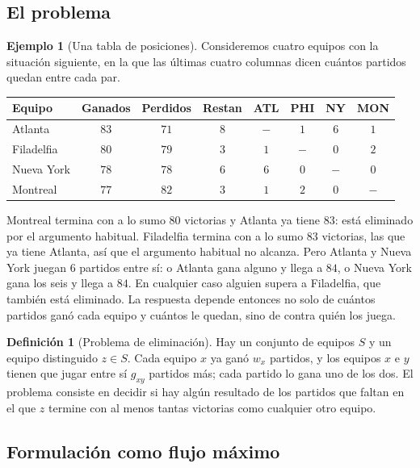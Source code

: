\documentclass[12pt, spanish, oneside, openany]{book}
\theoremstyle{uprightplain}
\theoremstyle{definition}
\newtheorem{definicion}[teorema]{Definición}
\newtheorem{ejemplo}[teorema]{Ejemplo}
\theoremstyle{remark}
\theoremstyle{definition}
\begin{document}
\subsection{El problema}

\begin{ejemplo}[Una tabla de posiciones]
\label{ej:flujo-beisbol}
Consideremos cuatro equipos con la situación siguiente, en la que las últimas cuatro columnas dicen cuántos partidos quedan entre cada par.
\begin{center}
\small
\renewcommand{\arraystretch}{1.15}
\begin{tabular}{@{}lccccccc@{}}
\toprule
\textbf{Equipo} & \textbf{Ganados} & \textbf{Perdidos} & \textbf{Restan} & \textbf{ATL} & \textbf{PHI} & \textbf{NY} & \textbf{MON}\\
\midrule
Atlanta      & $83$ & $71$ & $8$ & $-$ & $1$ & $6$ & $1$\\
Filadelfia   & $80$ & $79$ & $3$ & $1$ & $-$ & $0$ & $2$\\
Nueva York   & $78$ & $78$ & $6$ & $6$ & $0$ & $-$ & $0$\\
Montreal     & $77$ & $82$ & $3$ & $1$ & $2$ & $0$ & $-$\\
\bottomrule
\end{tabular}
\end{center}
Montreal termina con a lo sumo $80$ victorias y Atlanta ya tiene $83$: está eliminado por el argumento habitual. Filadelfia termina con a lo sumo $83$ victorias, las que ya tiene Atlanta, así que el argumento habitual no alcanza. Pero Atlanta y Nueva York juegan $6$ partidos entre sí: o Atlanta gana alguno y llega a $84$, o Nueva York gana los seis y llega a $84$. En cualquier caso alguien supera a Filadelfia, que también está eliminado. La respuesta depende entonces no solo de cuántos partidos ganó cada equipo y cuántos le quedan, sino de contra quién los juega.
\end{ejemplo}

\begin{definicion}[Problema de eliminación]
\label{def:flujo-beisbol}
Hay un conjunto de equipos $S$ y un equipo distinguido $z\in S$. Cada equipo $x$ ya ganó $w_x$ partidos, y los equipos $x$ e $y$ tienen que jugar entre sí $g_{xy}$ partidos más; cada partido lo gana uno de los dos. El problema consiste en decidir si hay algún resultado de los partidos que faltan en el que $z$ termine con al menos tantas victorias como cualquier otro equipo.
\end{definicion}

\subsection{Formulación como flujo máximo}
\end{document}
